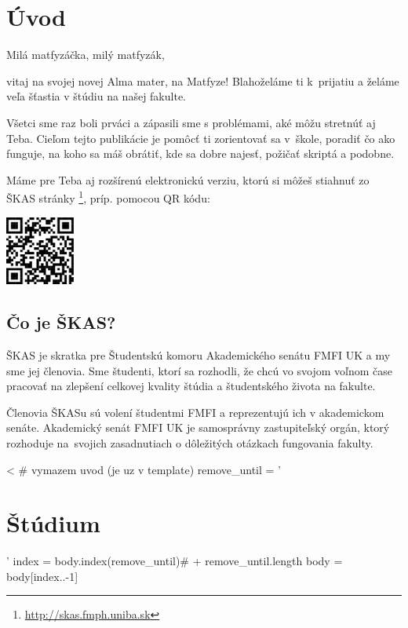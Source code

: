 \documentclass[11pt,slovak,twosides,openany]{scrbook}
\begin{document}

\chapter{Úvod}

Milá matfyzáčka, milý matfyzák,

vitaj na svojej novej Alma mater, na Matfyze! Blahoželáme ti k~prijatiu
a želáme veľa šťastia v štúdiu na našej fakulte.

Všetci sme raz boli prváci a zápasili sme s problémami, aké môžu stretnúť
aj Teba. Cieľom tejto publikácie je pomôcť ti zorientovať sa v~škole,
poradiť čo ako funguje, na koho sa máš obrátiť, kde sa dobre najesť,
požičať skriptá a podobne.

Máme pre Teba aj rozšírenú elektronickú verziu, ktorú si môžeš stiahnuť
zo ŠKAS stránky%
\footnote{\href{http://skas.fmph.uniba.sk}{http://skas.fmph.uniba.sk}%
}, príp. pomocou QR kódu:

\begin{center}
\includegraphics[width=0.17\textwidth]{images/qr_code}
\par\end{center}

\section{Čo je ŠKAS?}

ŠKAS je skratka pre Študentskú komoru Akademického senátu FMFI UK
a my sme jej členovia. Sme študenti, ktorí sa rozhodli, že chcú vo
svojom voľnom čase pracovať na zlepšení celkovej kvality štúdia a
študentského života na fakulte. 

Členovia ŠKASu sú volení študentmi FMFI a reprezentujú ich v akademickom
senáte. Akademický senát FMFI UK je samosprávny zastupiteľský orgán,
ktorý rozhoduje na svojich zasadnutiach o dôležitých otázkach fungovania
fakulty. 

<%
# vymazem uvod (je uz v template)
remove_until = '\chapter{Štúdium}'
index = body.index(remove_until)# + remove_until.length
body = body[index..-1]
\end{document}
